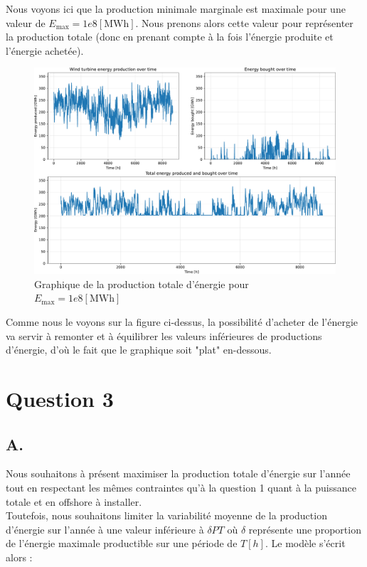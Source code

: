 \documentclass{article}
\begin{document}
\pagebreak

Nous voyons ici que la production minimale marginale est maximale pour une valeur de $E_{\text{max}} = 1e8 [\mathrm{MWh}]$.
Nous prenons alors cette valeur pour représenter la production totale (donc en prenant compte à la fois l'énergie produite et l'énergie achetée). 

\begin{figure}[ht!]
    \centering
    \includegraphics[scale=0.3]{Images/Partie_1/Q2/energy_produced_and_bought.pdf}
    \caption{Graphique de la production totale d'énergie pour $E_{\text{max}} = 1e8 [\mathrm{MWh}]$}
    \label{fig:total_energy_produced_and_bought_Q2}
\end{figure}
Comme nous le voyons sur la figure ci-dessus, la possibilité d'acheter de l'énergie va servir à remonter et à équilibrer les valeurs inférieures de productions d'énergie, d'où le fait que le graphique soit "plat" en-dessous.


\section*{Question 3}

\subsection*{A.}
Nous souhaitons à présent maximiser la production totale d'énergie sur l'année tout en respectant les mêmes contraintes qu'à la question 1 quant à la puissance totale et en offshore à installer.\\
Toutefois, nous souhaitons limiter la variabilité moyenne de la production d'énergie sur l'année à une valeur inférieure à $\delta P T$ où $\delta$ représente une proportion de l'énergie maximale productible sur une période de $T [h]$. Le modèle s'écrit alors :
\end{document}
